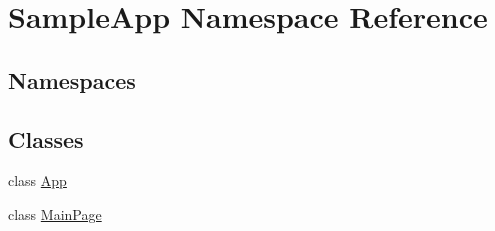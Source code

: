 \hypertarget{namespace_sample_app}{}\section{Sample\+App Namespace Reference}
\label{namespace_sample_app}
\subsection*{Namespaces}
\begin{DoxyCompactItemize}
\end{DoxyCompactItemize}
\subsection*{Classes}
\begin{DoxyCompactItemize}
\item 
class \hyperlink{class_sample_app_1_1_app}{App}
\item 
class \hyperlink{class_sample_app_1_1_main_page}{Main\+Page}
\end{DoxyCompactItemize}
